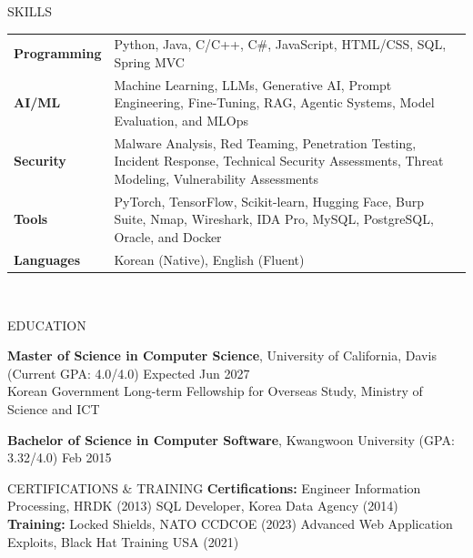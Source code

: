 \documentclass{resume}
\begin{document}
\begin{rSection}{SKILLS}
\begin{tabular}{ @{} >{\bfseries}l @{\hspace{2ex}} p{} }
Programming & Python, Java, C/C++, C\#, JavaScript, HTML/CSS, SQL, Spring MVC \\
AI/ML & Machine Learning, LLMs, Generative AI, Prompt Engineering, Fine-Tuning, RAG, Agentic Systems, Model Evaluation, and MLOps \\
Security & Malware Analysis, Red Teaming, Penetration Testing, Incident Response, Technical Security Assessments, Threat Modeling, Vulnerability Assessments \\
Tools & PyTorch, TensorFlow, Scikit-learn, Hugging Face, Burp Suite, Nmap, Wireshark, IDA Pro, MySQL, PostgreSQL, Oracle, and Docker \\
Languages & Korean (Native), English (Fluent) \\
\end{tabular}\\
\end{rSection}

\begin{rSection}{EDUCATION}

{\bf Master of Science in Computer Science}, University of California, Davis (Current GPA: 4.0/4.0) \hfill {Expected Jun 2027}\\
Korean Government Long-term Fellowship for Overseas Study, Ministry of Science and ICT

{\bf Bachelor of Science in Computer Software}, Kwangwoon University (GPA: 3.32/4.0) \hfill {Feb 2015}

\end{rSection}

\begin{rSection}{CERTIFICATIONS \& TRAINING}
\textbf{Certifications:} Engineer Information Processing, HRDK (2013) \quad SQL Developer, Korea Data Agency (2014) \\
\textbf{Training:} Locked Shields, NATO CCDCOE (2023) \quad Advanced Web Application Exploits, Black Hat Training USA (2021)
\end{rSection}
\end{document}
